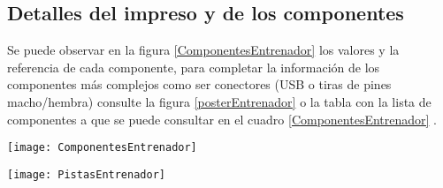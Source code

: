\subsection{Detalles del impreso y de los componentes}
Se puede observar en la figura \ref{ComponentesEntrenador} los valores y la referencia de cada componente, para completar la información de los componentes más complejos como ser conectores (USB o tiras de pines macho/hembra) consulte la figura \ref{posterEntrenador} o la tabla con la lista de componentes a que se puede consultar en el cuadro \ref{ComponentesEntrenador} . 
\begin{sidewaysfigure}[htb]
	\centering\texttt{[image: ComponentesEntrenador]}	\caption{Vista superior de los componentes del entrenador digital}\label{ComponentesEntrenador}
\end{sidewaysfigure}%
\begin{sidewaysfigure}[htb]
	\centering\texttt{[image: PistasEntrenador]}	\caption{Vista inferior detalle de las pistas del entrenador digital}\label{PistaEntrenador}
\end{sidewaysfigure}%
